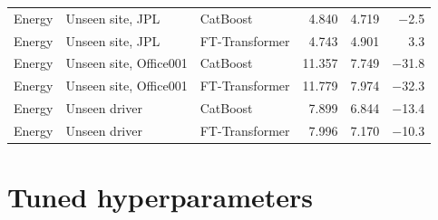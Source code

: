 {\begin{longtable}{lllrrr}
Energy & Unseen site, JPL & CatBoost & 4.840 & 4.719 & $-$2.5 \\
Energy & Unseen site, JPL & FT-Transformer & 4.743 & 4.901 & 3.3 \\
Energy & Unseen site, Office001 & CatBoost & 11.357 & 7.749 & $-$31.8 \\
Energy & Unseen site, Office001 & FT-Transformer & 11.779 & 7.974 & $-$32.3 \\
Energy & Unseen driver & CatBoost & 7.899 & 6.844 & $-$13.4 \\
Energy & Unseen driver & FT-Transformer & 7.996 & 7.170 & $-$10.3 \\
\end{longtable}}

\section{Tuned hyperparameters}
